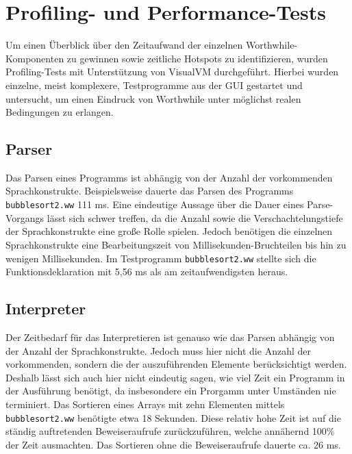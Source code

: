 \section{Profiling- und Performance-Tests}
Um einen Überblick über den Zeitaufwand der einzelnen Worthwhile-Komponenten zu gewinnen sowie zeitliche Hotspots zu identifizieren, wurden Profiling-Tests mit Unterstützung von VisualVM durchgeführt. Hierbei wurden einzelne, meist komplexere, Testprogramme aus der GUI gestartet und untersucht, um einen Eindruck von Worthwhile unter möglichst realen Bedingungen zu erlangen.

\subsection{Parser}
Das Parsen eines Programms ist abhängig von der Anzahl der vorkommenden Sprachkonstrukte. Beispielsweise dauerte das Parsen des Programms \texttt{bubblesort2.ww} 111 ms. Eine eindeutige Aussage über die Dauer eines Parse-Vorgangs lässt sich schwer treffen, da die Anzahl sowie die Verschachtelungstiefe der Sprachkonstrukte eine große Rolle spielen. Jedoch benötigen die einzelnen Sprachkonstrukte eine Bearbeitungszeit von Millisekunden-Bruchteilen bis hin zu wenigen Millisekunden. Im Testprogramm \texttt{bubblesort2.ww} stellte sich die Funktionsdeklaration mit 5,56 ms als am zeitaufwendigsten heraus.

\subsection{Interpreter}
Der Zeitbedarf für das Interpretieren ist genauso wie das Parsen abhängig von der Anzahl der Sprachkonstrukte. Jedoch muss hier nicht die Anzahl der vorkommenden, sondern die der auszuführenden Elemente berücksichtigt werden. Deshalb lässt sich auch hier nicht eindeutig sagen, wie viel Zeit ein Programm in der Ausführung benötigt, da insbesondere ein Prorgamm unter Umständen nie terminiert. Das Sortieren eines Arrays mit zehn Elementen mittels \texttt{bubblesort2.ww} benötigte etwa 18 Sekunden. Diese relativ hohe Zeit ist auf die ständig auftretenden Beweiseraufrufe zurückzuführen, welche annähernd 100\% der Zeit ausmachten. Das Sortieren ohne die Beweiseraufrufe dauerte ca. 26 ms.

